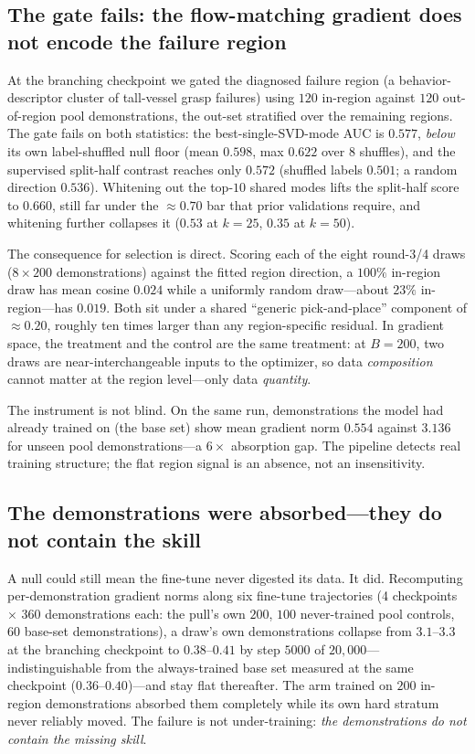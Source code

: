 \subsection{The gate fails: the flow-matching gradient does not encode the
failure region}
\label{sec:grad_q0}
At the branching checkpoint we gated the diagnosed failure region
(a behavior-descriptor cluster of tall-vessel grasp failures) using $120$
in-region against $120$ out-of-region pool demonstrations, the out-set
stratified over the remaining regions. The gate fails on both statistics: the
best-single-SVD-mode AUC is $0.577$, \emph{below} its own label-shuffled null
floor (mean $0.598$, max $0.622$ over $8$ shuffles), and the supervised
split-half contrast reaches only $0.572$ (shuffled labels $0.501$; a random
direction $0.536$). Whitening out the top-$10$ shared modes lifts the
split-half score to $0.660$, still far under the $\approx$$0.70$ bar that
prior validations require, and whitening further collapses it
($0.53$ at $k{=}25$, $0.35$ at $k{=}50$).

The consequence for selection is direct. Scoring each of the eight
round-3/4 draws ($8\times200$ demonstrations) against the fitted region
direction, a $100\%$ in-region draw has mean cosine $0.024$ while a
uniformly random draw---about $23\%$ in-region---has $0.019$. Both sit under a
shared ``generic pick-and-place'' component of $\approx$$0.20$, roughly ten
times larger than any region-specific residual. In gradient space, the treatment
and the control are the same treatment: at $B{=}200$, two draws are
near-interchangeable inputs to the optimizer, so data \emph{composition} cannot
matter at the region level---only data \emph{quantity}.

The instrument is not blind. On the same run, demonstrations the model had
already trained on (the base set) show mean gradient norm $0.554$ against
$3.136$ for unseen pool demonstrations---a $6\times$ absorption gap. The
pipeline detects real training structure; the flat region signal is an absence,
not an insensitivity.

\subsection{The demonstrations were absorbed---they do not contain the skill}
\label{sec:grad_q2}
A null could still mean the fine-tune never digested its data. It did.
Recomputing per-demonstration gradient norms along six fine-tune trajectories
(4 checkpoints $\times$ 360 demonstrations each: the pull's own $200$, $100$
never-trained pool controls, $60$ base-set demonstrations), a draw's own
demonstrations collapse from $3.1$--$3.3$ at the branching checkpoint to
$0.38$--$0.41$ by step $5000$ of $20{,}000$---indistinguishable from the
always-trained base set measured at the same checkpoint
($0.36$--$0.40$)---and stay flat thereafter. The arm trained on $200$ in-region
demonstrations absorbed them completely while its own hard stratum never
reliably moved. The failure is not under-training: \emph{the demonstrations do
not contain the missing skill}.

